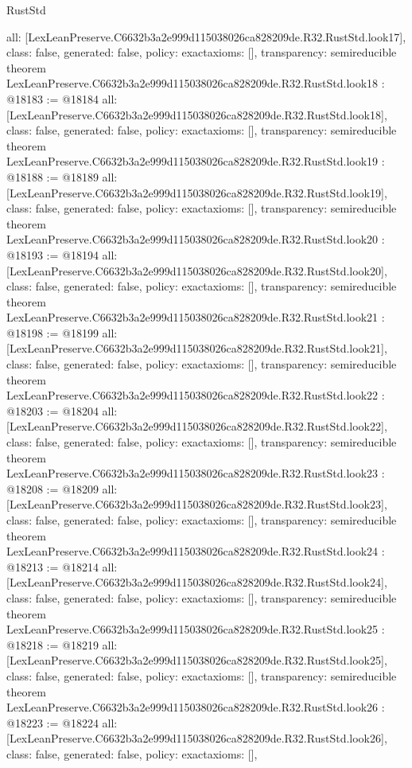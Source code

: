 \begin{lexlean}{RustStd}
\begin{coremodule}
{  all: [LexLeanPreserve.C6632b3a2e999d115038026ca828209de.R32.RustStd.look17],
  class: false,
  generated: false,
  policy: exact{axioms: []},
  transparency: semireducible
}
theorem LexLeanPreserve.C6632b3a2e999d115038026ca828209de.R32.RustStd.look18 : @18183 := @18184 {
  all: [LexLeanPreserve.C6632b3a2e999d115038026ca828209de.R32.RustStd.look18],
  class: false,
  generated: false,
  policy: exact{axioms: []},
  transparency: semireducible
}
theorem LexLeanPreserve.C6632b3a2e999d115038026ca828209de.R32.RustStd.look19 : @18188 := @18189 {
  all: [LexLeanPreserve.C6632b3a2e999d115038026ca828209de.R32.RustStd.look19],
  class: false,
  generated: false,
  policy: exact{axioms: []},
  transparency: semireducible
}
theorem LexLeanPreserve.C6632b3a2e999d115038026ca828209de.R32.RustStd.look20 : @18193 := @18194 {
  all: [LexLeanPreserve.C6632b3a2e999d115038026ca828209de.R32.RustStd.look20],
  class: false,
  generated: false,
  policy: exact{axioms: []},
  transparency: semireducible
}
theorem LexLeanPreserve.C6632b3a2e999d115038026ca828209de.R32.RustStd.look21 : @18198 := @18199 {
  all: [LexLeanPreserve.C6632b3a2e999d115038026ca828209de.R32.RustStd.look21],
  class: false,
  generated: false,
  policy: exact{axioms: []},
  transparency: semireducible
}
theorem LexLeanPreserve.C6632b3a2e999d115038026ca828209de.R32.RustStd.look22 : @18203 := @18204 {
  all: [LexLeanPreserve.C6632b3a2e999d115038026ca828209de.R32.RustStd.look22],
  class: false,
  generated: false,
  policy: exact{axioms: []},
  transparency: semireducible
}
theorem LexLeanPreserve.C6632b3a2e999d115038026ca828209de.R32.RustStd.look23 : @18208 := @18209 {
  all: [LexLeanPreserve.C6632b3a2e999d115038026ca828209de.R32.RustStd.look23],
  class: false,
  generated: false,
  policy: exact{axioms: []},
  transparency: semireducible
}
theorem LexLeanPreserve.C6632b3a2e999d115038026ca828209de.R32.RustStd.look24 : @18213 := @18214 {
  all: [LexLeanPreserve.C6632b3a2e999d115038026ca828209de.R32.RustStd.look24],
  class: false,
  generated: false,
  policy: exact{axioms: []},
  transparency: semireducible
}
theorem LexLeanPreserve.C6632b3a2e999d115038026ca828209de.R32.RustStd.look25 : @18218 := @18219 {
  all: [LexLeanPreserve.C6632b3a2e999d115038026ca828209de.R32.RustStd.look25],
  class: false,
  generated: false,
  policy: exact{axioms: []},
  transparency: semireducible
}
theorem LexLeanPreserve.C6632b3a2e999d115038026ca828209de.R32.RustStd.look26 : @18223 := @18224 {
  all: [LexLeanPreserve.C6632b3a2e999d115038026ca828209de.R32.RustStd.look26],
  class: false,
  generated: false,
  policy: exact{axioms: []},
}
\end{coremodule}
\end{lexlean}
